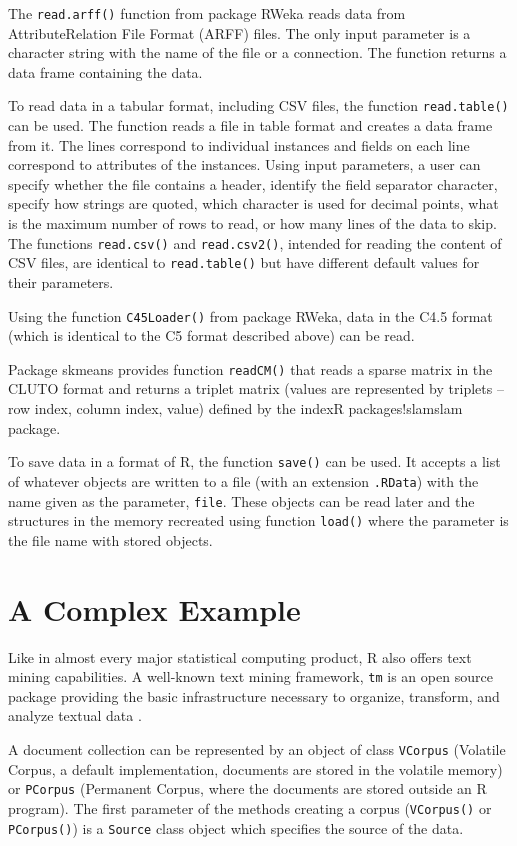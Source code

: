 The \texttt{read.arff()} function from package RWeka reads data from AttributeRelation File Format (ARFF) files. The only input parameter is a character string with the name of the file or a connection. The function returns a data frame
containing the data.

To read data in a tabular format, including CSV files, the function
\texttt{read.table()} can be used. The function reads a file in table format and creates
a data frame from it. The lines correspond to individual instances and fields on
each line correspond to attributes of the instances. Using input parameters, a user
can specify whether the file contains a header, identify the field separator character,
specify how strings are quoted, which character is used for decimal points,
what is the maximum number of rows to read, or how many lines of the data
to skip. The functions \texttt{read.csv()} and \texttt{read.csv2()}, intended for reading the
content of CSV files, are identical to \texttt{read.table()} but have different default
values for their parameters.

Using the function \texttt{C45Loader()} from package RWeka, data in the C4.5 format (which is identical to the C5 format described above) can be read.

Package skmeans provides function \texttt{readCM()} that reads a sparse matrix in
the CLUTO format and returns a triplet matrix (values are represented by triplets
– row index, column index, value) defined by the indexR packages!slamslam
package.

To save data in a format of R, the function \texttt{save()} can be used. It accepts
a list of whatever objects are written to a file (with an extension \texttt{.RData}) with
the name given as the parameter, \texttt{file}. These objects can be read later and the
structures in the memory recreated using function \texttt{load()} where the parameter
is the file name with stored objects.

\section{A Complex Example}

Like in almost every major statistical computing product, R also offers text mining capabilities. A well-known text mining framework, \texttt{tm} is an open source
package providing the basic infrastructure necessary to organize, transform, and
analyze textual data \cite{ref86}.

A document collection can be represented by an object of class \texttt{VCorpus}
(Volatile Corpus, a default implementation, documents are stored in the volatile
memory) or \texttt{PCorpus} (Permanent Corpus, where the documents are stored
outside an R program). The first parameter of the methods creating a corpus
(\texttt{VCorpus()} or \texttt{PCorpus()}) is a \texttt{Source} class object which specifies the source
of the data.


